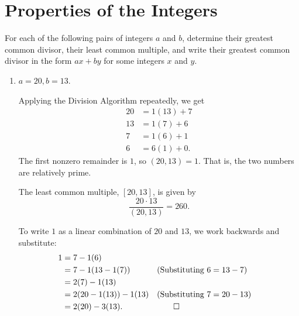 \section{Properties of the Integers}

 For each of the following pairs of integers $a$ and $b$,
determine their greatest common divisor, their least common multiple,
and write their greatest common divisor in the form $ax + by$ for some
integers $x$ and $y$.
\begin{enumerate}

\item
  $a = 20, b = 13$.
  \begin{solution}
    Applying the Division Algorithm repeatedly, we get
    \begin{align*}
      20 &= 1(13) + 7 \\
      13 &= 1(7) + 6 \\
      7 &= 1(6) + 1 \\
      6 &= 6(1) + 0.
    \end{align*}
    The first nonzero remainder is $1$, so $(20,13) = 1$. That is, the
    two numbers are relatively prime.

    The least common multiple, $[20, 13]$, is given by
    \begin{equation*}
      \frac{20\cdot13}{(20, 13)} = 260.
    \end{equation*}

    To write $1$ as a linear combination of $20$ and $13$, we work
    backwards and substitute:
    \begin{align*}
      1 &= 7 - 1(6) \\
        &= 7 - 1(13 - 1(7)) && \text{(Substituting $6 = 13 - 7$)} \\
        &= 2(7) - 1(13) \\
        &= 2(20 - 1(13)) - 1(13) && \text{(Substituting $7 = 20 - 13$)} \\
        &= 2(20) - 3(13). && \qedhere
    \end{align*}
  \end{solution}


\end{enumerate}
